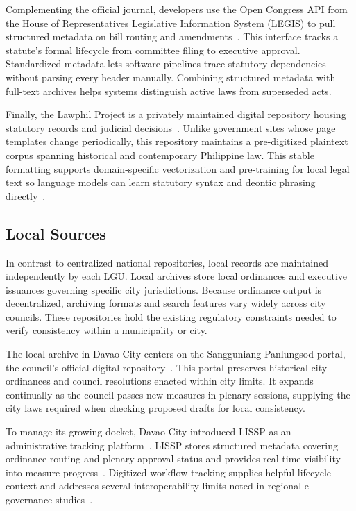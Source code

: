    Complementing the official journal, developers use the Open Congress API from the House of Representatives Legislative Information System (LEGIS) to pull structured metadata on bill routing and amendments~\cite{hrep2023legis}. This interface tracks a statute's formal lifecycle from committee filing to executive approval. Standardized metadata lets software pipelines trace statutory dependencies without parsing every header manually. Combining structured metadata with full-text archives helps systems distinguish active laws from superseded acts.

   Finally, the Lawphil Project is a privately maintained digital repository housing statutory records and judicial decisions~\cite{lawphil2000}. Unlike government sites whose page templates change periodically, this repository maintains a pre-digitized plaintext corpus spanning historical and contemporary Philippine law. This stable formatting supports domain-specific vectorization and pre-training for local legal text so language models can learn statutory syntax and deontic phrasing directly~\cite{zheng2021when}.

   \subsection{Local Sources}
   In contrast to centralized national repositories, local records are maintained independently by each LGU. Local archives store local ordinances and executive issuances governing specific city jurisdictions. Because ordinance output is decentralized, archiving formats and search features vary widely across city councils. These repositories hold the existing regulatory constraints needed to verify consistency within a municipality or city.

   The local archive in Davao City centers on the Sangguniang Panlungsod portal, the council's official digital repository~\cite{davaocity_sp_dept}. This portal preserves historical city ordinances and council resolutions enacted within city limits. It expands continually as the council passes new measures in plenary sessions, supplying the city laws required when checking proposed drafts for local consistency.

   To manage its growing docket, Davao City introduced LISSP as an administrative tracking platform~\cite{citygov2025lissp}. LISSP stores structured metadata covering ordinance routing and plenary approval status and provides real-time visibility into measure progress~\cite{patumbon2025lissp}. Digitized workflow tracking supplies helpful lifecycle context and addresses several interoperability limits noted in regional e-governance studies~\cite{conchas2025digital}.

